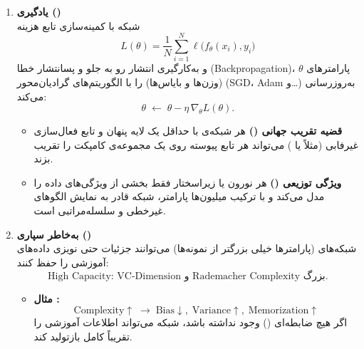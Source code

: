 \begin{enumerate}
	\begin{enumerate}
		\item \textbf{یادگیری ()}\\
		شبکه با کمینه‌سازی تابع هزینه
		\[
		L(\theta) = \frac{1}{N} \sum_{i=1}^{N} \ell\bigl(f_\theta(x_i), y_i\bigr)
		\]
		و به‌کارگیری انتشار رو به جلو و پسانتشار خطا (Backpropagation)، پارامترهای \(\theta\) (وزن‌ها و بایاس‌ها) را با الگوریتم‌های گرادیان‌محور (SGD، Adam و…) به‌روزرسانی می‌کند:
		\[
		\theta \;\leftarrow\; \theta - \eta\,\nabla_\theta L(\theta).
		\]
		\begin{itemize}
			\item \textbf{قضیه تقریب جهانی ()}  
			هر شبکه‌ی با حداقل یک لایه پنهان و تابع فعال‌سازی غیرفابی (مثلاً  یا ) می‌تواند هر تابع پیوسته روی یک مجموعه‌ی کامپکت را تقریب بزند.
			\item \textbf{ویژگی توزیعی ()}  
			هر نورون یا زیراسختار فقط بخشی از ویژگی‌های داده را مدل می‌کند و با ترکیب میلیون‌ها پارامتر، شبکه قادر به نمایش الگوهای غیرخطی و سلسله‌مراتبی است.
		\end{itemize}
		
		\item \textbf{به‌خاطر سپاری ()}\\
		شبکه‌های  (پارامترها خیلی بزرگتر از نمونه‌ها) می‌توانند جزئیات حتی نویزی داده‌های آموزشی را حفظ کنند:
		\[
		\text{High Capacity: VC-Dimension و Rademacher Complexity بزرگ.}
		\]
		\begin{itemize}
			\item \textbf{مثال :}  
			\[
			\text{Complexity}\!\uparrow \;\to\; \text{Bias}\!\downarrow,\;\text{Variance}\!\uparrow,\;\text{Memorization}\!\uparrow
			\]
			اگر هیچ ضابطه‌ای () وجود نداشته باشد، شبکه می‌تواند اطلاعات آموزشی را تقریباً کامل بازتولید کند.
		\end{itemize}
		

\end{enumerate}
\end{enumerate}
